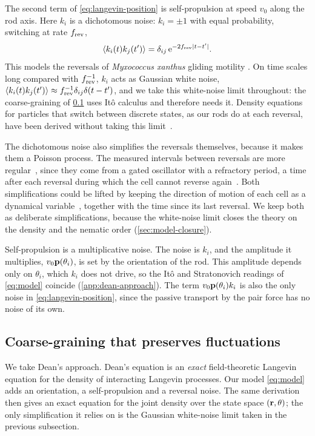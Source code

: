 \documentclass[aps,pre,reprint,superscriptaddress,longbibliography,nofootinbib
]{revtex4-2}
\begin{document}
The second term of \cref{eq:langevin-position} is
self-propulsion at speed $v_0$ along the rod axis. Here
$k_i$ is a dichotomous noise: $k_i=\pm1$ with equal
probability, switching at rate $f_{\rm rev}$,
\begin{equation}
    \label{eq:k-dichotomous}
    \left\langle k_i(t)k_j(t')\right\rangle = \delta_{ij}\,\mathrm{e}^{-2f_{\rm rev}|t-t'|}.
\end{equation}
This models the reversals of \textit{Myxococcus xanthus}
gliding motility \cite{blackhart1985frizzy,guzzo2018gated}.
On time scales long compared with $f_{\rm rev}^{-1}$, $k_i$ acts
as Gaussian white noise, $\langle
k_i(t)k_j(t')\rangle \approx
f_{\rm rev}^{-1}\delta_{ij}\delta(t-t')$, and we take this
white-noise limit throughout: the coarse-graining of
\cref{sec:model-coarse} uses It\^o calculus and therefore
needs it.
Density equations for particles that switch
between discrete states, as our rods do at each reversal,
have been derived without taking this
limit~\cite{bressloff2024global,spinney2025dean}.

The dichotomous noise also simplifies the reversals
themselves, because it makes them a Poisson process. The
measured intervals between reversals are more
regular~\cite{wu2009periodic}, since they come from a gated
oscillator with a refractory period, a time after each
reversal during which the cell cannot reverse
again~\cite{guzzo2018gated}. Both simplifications could be
lifted by keeping the direction of motion of each cell as a
dynamical variable~\cite{spinney2025dean}, together with
the time since its last reversal. We keep both as
deliberate simplifications, because the white-noise limit
closes the theory on the density and the nematic order
(\cref{sec:model-closure}).


Self-propulsion is a multiplicative noise. The noise is
$k_i$, and the amplitude it multiplies, $v_0\mathbf{p}(\theta_i)$,
is set by the orientation of the rod. This amplitude
depends only on $\theta_i$, which $k_i$ does not drive, so
the It\^o and Stratonovich readings of \cref{eq:model}
coincide (\cref{app:dean-approach}). The term
$v_0\mathbf{p}(\theta_i)k_i$ is also the only noise in
\cref{eq:langevin-position}, since the passive transport by
the pair force has no noise of its own.

\subsection{Coarse-graining that preserves fluctuations}
\label{sec:model-coarse}
We take Dean's approach. Dean's equation \cite{dean1996} is
an \emph{exact} field-theoretic Langevin equation for the
density of interacting Langevin processes. Our model
\eqref{eq:model} adds an orientation, a self-propulsion and
a reversal noise. The same derivation then gives an exact
equation for the joint density over the state space
$(\mathbf{r},\theta)$; the only simplification it relies on is the
Gaussian white-noise limit taken in the previous
subsection.
\end{document}

